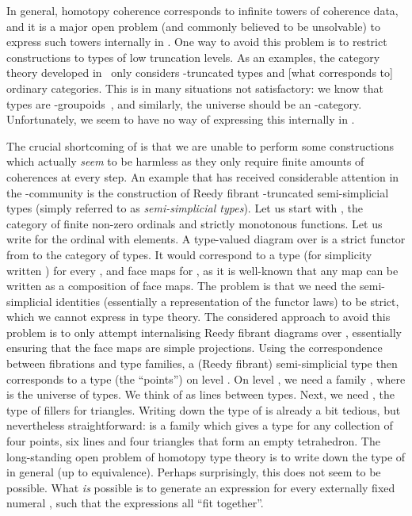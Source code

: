 \documentclass[a4paper,reqno]{amsart}
\theoremstyle{plain}
\theoremstyle{definition}
\begin{document}
In general, homotopy coherence corresponds to infinite towers of coherence data, and it is a major open problem (and commonly believed to be unsolvable) to express such towers internally in .
One way to avoid this problem is to restrict constructions to types of low truncation levels.
As an examples, the category theory developed in~\cite{ahrens_rezk} only considers -truncated types and [what corresponds to] ordinary categories.
This is in many situations not satisfactory: we know that types are -groupoids~\cite{lumsdaine_phd,bg:type-wkom}, and similarly, the universe should be an -category. 
Unfortunately, we seem to have no way of expressing this internally in .

The crucial shortcoming of  is that we are unable to perform some constructions 
which actually \emph{seem} to be harmless as they only require finite amounts of coherences at every step.
An example that has received considerable attention in the -community is the construction of Reedy fibrant -truncated semi-simplicial types (simply referred to as \emph{semi-simplicial types}).
Let us start with , the category of finite non-zero ordinals and strictly monotonous functions.
Let us write  for the ordinal with  elements.
A type-valued diagram over  is a strict functor from  to the category of types.
It would correspond to a type  (for simplicity written ) for every , and face maps  for , as it is well-known that any map can be written as a composition of face maps.
The problem is that we need the semi-simplicial identities (essentially a representation of the functor laws) to be strict, which we cannot express in type theory.
The considered approach to avoid this problem is to only attempt internalising Reedy fibrant diagrams over , essentially ensuring that the face maps are simple projections.
Using the correspondence between fibrations and type families, a (Reedy fibrant) semi-simplicial type then 
corresponds to a type  (the ``points'') on level . 
On level , we need a family , where  is the universe of types. 
We think of  as lines between types.
Next, we need , the type of fillers for triangles. 
Writing down the type of  is already a bit tedious, but nevertheless straightforward:  is a family which gives a type for any collection of four points, six lines and four triangles that form an empty tetrahedron.
The long-standing open problem of homotopy type theory is to write down the type of  in general (up to equivalence).
Perhaps surprisingly, this does not seem to be possible.
What \emph{is} possible is to generate an expression  for every externally fixed numeral , such that the expressions  all ``fit together''.
\end{document}
